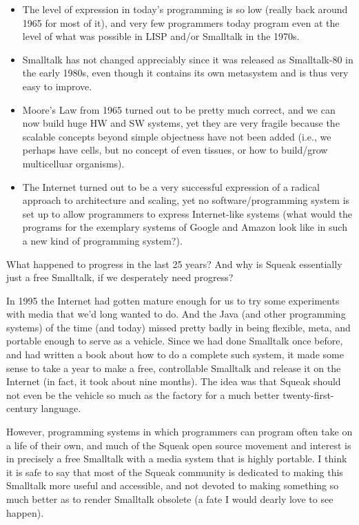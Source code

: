 \documentclass[a4paper,10pt,twoside]{book}
\begin{document}
\begin{itemize}
\item  The level of expression in today’s programming is so low (really back around 1965 for 
most of it), and very few programmers today program even at the level of what was possible in LISP and/or Smalltalk in the 1970s. 

\item  Smalltalk has not changed appreciably since it was released as Smalltalk-80 in the early 
1980s, even though it contains its own metasystem and is thus very easy to improve. 

\item  Moore’s Law from 1965 turned out to be pretty much correct, and we can now build huge HW and SW systems, yet they are very fragile because the scalable concepts 
beyond simple objectness have not been added (i.e., we perhaps have cells, but no 
concept of even tissues, or how to build/grow multicelluar organisms). 

\item  The Internet turned out to be a very successful expression of a radical approach to 
architecture and scaling, yet no software/programming system is set up to allow programmers to express Internet-like systems (what would the programs for the exemplary 
systems of Google and Amazon look like in such a new kind of programming system?).

\end{itemize}
 
What happened to progress in the last 25 years? And why is Squeak essentially just a free 
Smalltalk, if we desperately need progress? 

In 1995 the Internet had gotten mature enough for us to try some experiments with media 
that we’d long wanted to do. And the Java (and other programming systems) of the time (and 
today) missed pretty badly in being flexible, meta, and portable enough to serve as a vehicle. 
Since we had done Smalltalk once before, and had written a book about how to do a complete 
such system, it made some sense to take a year to make a free, controllable Smalltalk and release 
it on the Internet (in fact, it took about nine months). The idea was that Squeak should not even 
be the vehicle so much as the factory for a much better twenty-first-century language. 


However, programming systems in which programmers can program often take on a life 
of their own, and much of the Squeak open source movement and interest is in precisely a free 
Smalltalk with a media system that is highly portable. I think it is safe to say that most of the 
Squeak community is dedicated to making this Smalltalk more useful and accessible, and not devoted to making something so much better as to render Smalltalk obsolete (a fate I would 
dearly love to see happen). 
\end{document}
